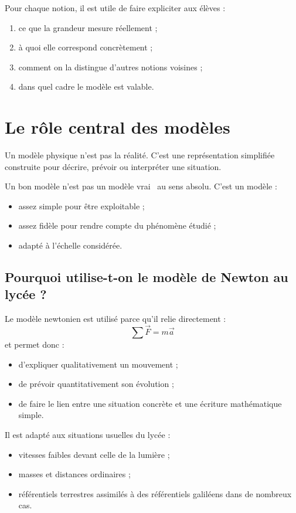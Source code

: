 \documentclass[11pt,a4paper]{article}
\begin{document}
\begin{idee}
Pour chaque notion, il est utile de faire expliciter aux élèves :
\begin{enumerate}
    \item ce que la grandeur mesure réellement ;
    \item à quoi elle correspond concrètement ;
    \item comment on la distingue d'autres notions voisines ;
    \item dans quel cadre le modèle est valable.
\end{enumerate}
\end{idee}

\section{Le rôle central des modèles}

Un modèle physique n'est pas la réalité.
C'est une représentation simplifiée construite pour décrire, prévoir ou interpréter une situation.

\begin{modele}
Un bon modèle n'est pas un modèle \og vrai \fg\ au sens absolu.
C'est un modèle :
\begin{itemize}
    \item assez simple pour être exploitable ;
    \item assez fidèle pour rendre compte du phénomène étudié ;
    \item adapté à l'échelle considérée.
\end{itemize}
\end{modele}

\subsection{Pourquoi utilise-t-on le modèle de Newton au lycée ?}

\begin{modele}
Le modèle newtonien est utilisé parce qu'il relie directement :
\[
\sum \vec F = m\vec a
\]
et permet donc :
\begin{itemize}
    \item d'expliquer qualitativement un mouvement ;
    \item de prévoir quantitativement son évolution ;
    \item de faire le lien entre une situation concrète et une écriture mathématique simple.
\end{itemize}

Il est adapté aux situations usuelles du lycée :
\begin{itemize}
    \item vitesses faibles devant celle de la lumière ;
    \item masses et distances ordinaires ;
    \item référentiels terrestres assimilés à des référentiels galiléens dans de nombreux cas.
\end{itemize}
\end{modele}
\end{document}
